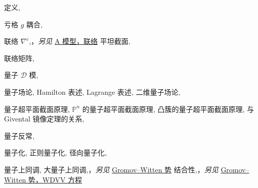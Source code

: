 \begin{theindex}
\subitem \leavevmode\hypertarget{idx:0377}{定义},\enspace{}
\indexspace
\item \leavevmode\hypertarget{idx:0375}{亏格 $g$ 耦合},\enspace{}
\indexspace
\item \leavevmode\hypertarget{idx:0172}{联络 $\nabla^c$},\enspace{}，\textit{另见} \hyperlink{idx:0003}{A 模型，联络}
\subitem \leavevmode\hypertarget{idx:0173}{平坦截面},\enspace{}
\indexspace
\item \leavevmode\hypertarget{idx:0174}{联络矩阵},\enspace{}
\indexspace
\item \leavevmode\hypertarget{idx:1109}{量子 $\mathcal D$ 模},\enspace{}
\indexspace
\item \leavevmode\hypertarget{idx:1155}{量子场论},\enspace{}
\subitem \leavevmode\hypertarget{idx:1156}{Hamilton 表述},\enspace{}
\subitem \leavevmode\hypertarget{idx:1157}{Lagrange 表述},\enspace{}
\subitem \leavevmode\hypertarget{idx:1158}{二维量子场论},\enspace{}
\indexspace
\item \leavevmode\hypertarget{idx:1159}{量子超平面截面原理},\enspace{}
\subitem \leavevmode\hypertarget{idx:1160}{$\mathbb P^n$ 的量子超平面截面原理},\enspace{}
\subitem \leavevmode\hypertarget{idx:1161}{凸簇的量子超平面截面原理},\enspace{}
\subitem \leavevmode\hypertarget{idx:1162}{与 Givental 镜像定理的关系},\enspace{}
\indexspace
\item \leavevmode\hypertarget{idx:1110}{量子反常},\enspace{}
\indexspace
\item \leavevmode\hypertarget{idx:1106}{量子化},\enspace{}
\subitem \leavevmode\hypertarget{idx:1107}{正则量子化},\enspace{}
\subitem \leavevmode\hypertarget{idx:1108}{径向量子化},\enspace{}
\indexspace
\item \leavevmode\hypertarget{idx:1111}{量子上同调},\enspace{}
\subitem \leavevmode\hypertarget{idx:1112}{大量子上同调},\enspace{}，\textit{另见} \hyperlink{idx:0552}{Gromov--Witten 势}
\subsubitem \leavevmode\hypertarget{idx:1113}{结合性},\enspace{}，\textit{另见} \hyperlink{idx:0568}{Gromov--Witten 势，WDVV 方程}

\end{theindex}
